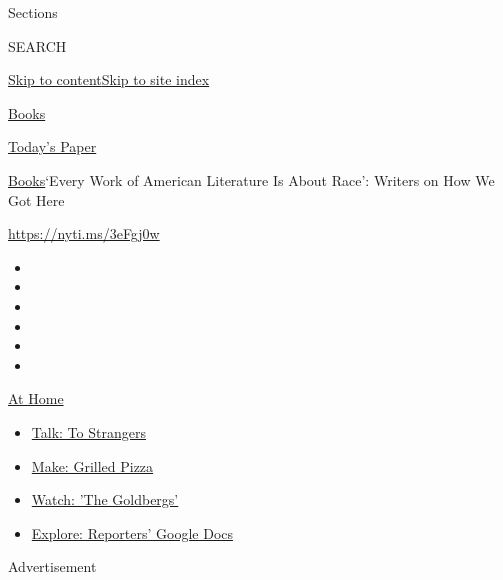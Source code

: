 Sections

SEARCH

\protect\hyperlink{site-content}{Skip to
content}\protect\hyperlink{site-index}{Skip to site index}

\href{https://www.nytimes.com/section/books}{Books}

\href{https://myaccount.nytimes.com/auth/login?response_type=cookie\&client_id=vi}{}

\href{https://www.nytimes.com/section/todayspaper}{Today's Paper}

\href{/section/books}{Books}\textbar{}`Every Work of American Literature
Is About Race': Writers on How We Got Here

\url{https://nyti.ms/3eFgj0w}

\begin{itemize}
\item
\item
\item
\item
\item
\item
\end{itemize}

\href{https://www.nytimes.com/spotlight/at-home?action=click\&pgtype=Article\&state=default\&region=TOP_BANNER\&context=at_home_menu}{At
Home}

\begin{itemize}
\tightlist
\item
  \href{https://www.nytimes.com/2020/08/03/well/family/the-benefits-of-talking-to-strangers.html?action=click\&pgtype=Article\&state=default\&region=TOP_BANNER\&context=at_home_menu}{Talk:
  To Strangers}
\item
  \href{https://www.nytimes.com/2020/08/01/at-home/coronavirus-make-pizza-on-a-grill.html?action=click\&pgtype=Article\&state=default\&region=TOP_BANNER\&context=at_home_menu}{Make:
  Grilled Pizza}
\item
  \href{https://www.nytimes.com/2020/07/31/arts/television/goldbergs-abc-stream.html?action=click\&pgtype=Article\&state=default\&region=TOP_BANNER\&context=at_home_menu}{Watch:
  'The Goldbergs'}
\item
  \href{https://www.nytimes.com/interactive/2020/at-home/even-more-reporters-editors-diaries-lists-recommendations.html?action=click\&pgtype=Article\&state=default\&region=TOP_BANNER\&context=at_home_menu}{Explore:
  Reporters' Google Docs}
\end{itemize}

Advertisement

